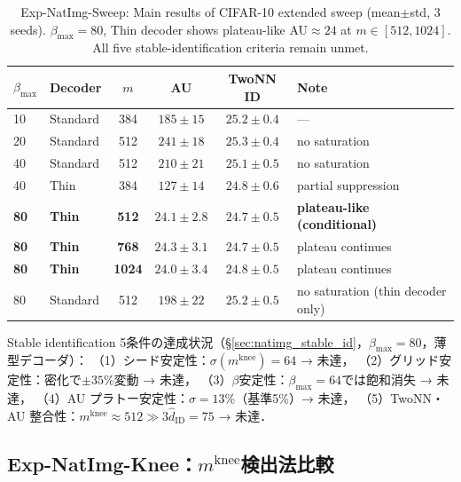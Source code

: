 \documentclass[11pt,a4paper]{jsarticle}
\newcommand{\mknee}{m^{\mathrm{knee}}}
\begin{document}
\begin{table}[H]
\centering
\caption{Exp-NatImg-Sweep: Main results of CIFAR-10 extended sweep (mean$\pm$std, 3 seeds). $\beta_\mathrm{max}=80$, Thin decoder shows plateau-like AU$\approx24$ at $m \in [512,1024]$. All five stable-identification criteria remain unmet.}
\label{tab:natimg_sweep}
\small
\begin{tabular}{llcccl}
\toprule
$\beta_{\max}$ & Decoder & $m$ & AU & TwoNN ID & Note \\
\midrule
10 & Standard & 384 & $185\pm15$ & $25.2\pm0.4$ & --- \\
20 & Standard & 512 & $241\pm18$ & $25.3\pm0.4$ & no saturation \\
40 & Standard & 512 & $210\pm21$ & $25.1\pm0.5$ & no saturation \\
40 & Thin      & 384 & $127\pm14$ & $24.8\pm0.6$ & partial suppression \\
\textbf{80} & \textbf{Thin} & \textbf{512} & $\boldsymbol{24.1\pm2.8}$ & $24.7\pm0.5$ & \textbf{plateau-like (conditional)} \\
\textbf{80} & \textbf{Thin} & \textbf{768} & $\boldsymbol{24.3\pm3.1}$ & $24.7\pm0.5$ & plateau continues \\
\textbf{80} & \textbf{Thin} & \textbf{1024}& $\boldsymbol{24.0\pm3.4}$ & $24.8\pm0.5$ & plateau continues \\
80 & Standard  & 512 & $198\pm22$ & $25.2\pm0.5$ & no saturation (thin decoder only) \\
\bottomrule
\end{tabular}
\end{table}

Stable identification 5条件の達成状況（§\ref{sec:natimg_stable_id}，$\beta_{\max}=80$，薄型デコーダ）：
（1）シード安定性：$\sigma(\mknee)=64$ → 未達，
（2）グリッド安定性：密化で$\pm35\%$変動 → 未達，
（3）$\beta$安定性：$\beta_{\max}=64$では飽和消失 → 未達，
（4）AU プラトー安定性：$\sigma=13\%$（基準5\%）→ 未達，
（5）TwoNN・AU 整合性：$\mknee \approx 512 \gg 3\hat{d}_\mathrm{ID}=75$ → 未達．

\subsection*{Exp-NatImg-Knee：$\mknee$検出法比較}
\end{document}
